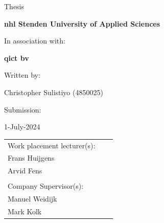 \begin{center}
    \vspace{0.5cm}
    \large{Thesis}
    \vspace{0.5cm}

    \textbf{\acrshort{nhl} Stenden University of Applied Sciences}

    \vspace{0.5cm}




    \vspace{0.5cm}

    In association with:

    \vspace{0.5cm}

    \textbf{\acrlong{qict} \acrshort{bv}}

    \vspace{0.5cm}

    Written by: \vspace{0.5cm}

    Christopher Sulistiyo (4850025) \vspace{0.5cm}

    Submission: \vspace{0.5cm}

    1-July-2024 \vspace{0.5cm} \vspace{0.5cm}

    \vfill
\end{center}
\begin{tabular}{p{7cm}p{7cm}p{5cm} }
    Work placement lecturer(s): \\
    Frans Huijgens              \\
    Arvid Fens                  \\
    \vspace{0.0cm}              \\

    Company Supervisor(s):      \\
    Manuel Weidijk              \\
    Mark Kolk                   \\
\end{tabular}

\vspace{0.5cm}
\addtocounter{page}{-1}